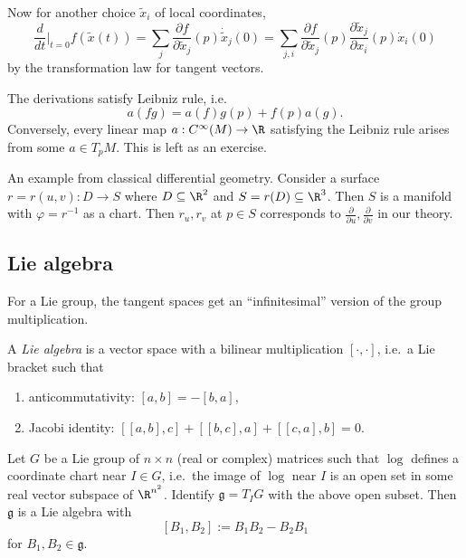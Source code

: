\documentclass[a4paper]{article}
\begin{document}
Now for another choice \(\tilde x_i\) of local coordinates,
\[
  \frac{d}{dt} \Big|_{t = 0} f(\tilde x(t))
  = \sum_j \frac{\partial f}{\partial \tilde x_j} (p) \dot{\tilde x}_j(0)
  = \sum_{j, i} \frac{\partial f}{\partial \tilde x_j}(p) \frac{\partial \tilde x_j}{\partial x_i}(p) \dot x_i(0)
\]
by the transformation law for tangent vectors.%

The derivations satisfy Leibniz rule, i.e.\
\[
  a(fg) = a(f)g(p) + f(p)a(g).
\]
Conversely, every linear map \(a: C^\infty(M) \to \R\) satisfying the Leibniz rule arises from some \(a \in T_pM\). This is left as an exercise.

\begin{eg}
  An example from classical differential geometry. Consider a surface \(r = r(u, v): D \to S\) where \(D \subseteq \R^2\) and \(S = r(D) \subseteq \R^3\). Then \(S\) is a manifold with \(\varphi = r^{-1}\) as a chart. Then \(r_u, r_v\) at \(p \in S\) corresponds to \(\frac{\partial}{\partial u}, \frac{\partial}{\partial v}\) in our theory.
\end{eg}

\subsection{Lie algebra}

For a Lie group, the tangent spaces get an ``infinitesimal'' version of the group multiplication.

\begin{definition}
  A \emph{Lie algebra} is a vector space with a bilinear multiplication \([\cdot, \cdot]\), i.e.\ a Lie bracket such that
  \begin{enumerate}
  \item anticommutativity: \([a, b] = -[b, a]\),
  \item Jacobi identity: \([[a, b], c] + [[b, c], a] + [[c, a], b] = 0\).
  \end{enumerate}
\end{definition}

\begin{theorem}
  Let \(G\) be a Lie group of \(n \times n\) (real or complex) matrices such that \(\log\) defines a coordinate chart near \(I \in G\), i.e.\ the image of \(\log\) near \(I\) is an open set in some real vector subspace of \(\R^{n^2}\). Identify \(\mathfrak g = T_IG\) with the above open subset. Then \(\mathfrak g\) is a Lie algebra with
  \[
    [B_1, B_2] := B_1B_2 - B_2B_1
  \]
  for \(B_1, B_2 \in \mathfrak g\).
\end{theorem}
\end{document}

